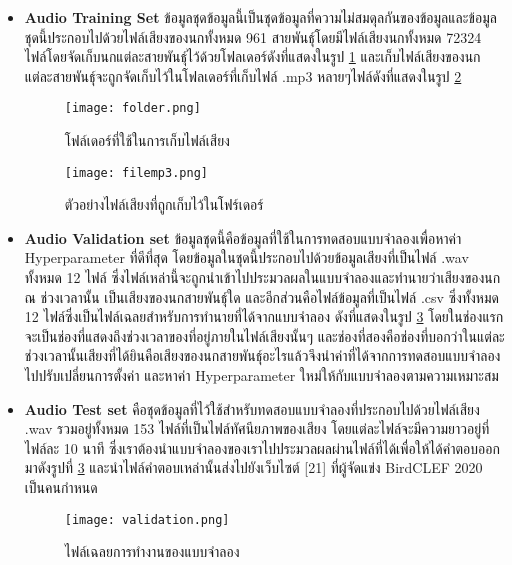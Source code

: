 \begin{itemize}
    \item \textbf{Audio Training Set} ข้อมูลชุดข้อมูลนี้เป็นชุดข้อมูลที่ความไม่สมดุลกันของข้อมูลและข้อมูลชุดนี้ประกอบไปด้วยไฟล์เสียงของนกทั้งหมด 961 สายพันธุ์โดยมีไฟล์เสียงนกทั้งหมด 72324 ไฟล์โดยจัดเก็บนกแต่ละสายพันธุ์ไว้ด้วยโฟลเดอร์ดังที่แสดงในรูป \ref{Fig:folder} และเก็บไฟล์เสียงของนกแต่ละสายพันธุ์จะถูกจัดเก็บไว้ในโฟลเดอร์ที่เก็บไฟล์ .mp3 หลายๆไฟล์ดังที่แสดงในรูป \ref{Fig:filemp3}
    \begin{figure}[h]
        \centering
        \texttt{[image: folder.png]}
        \caption{โฟล์เดอร์ที่ใช้ในการเก็บไฟล์เสียง}
        \label{Fig:folder}
    \end{figure}
    \begin{figure}[h]
        \centering
        \texttt{[image: filemp3.png]}
        \caption{ตัวอย่างไฟล์เสียงที่ถูกเก็บไว้ในโฟร์เดอร์}
        \label{Fig:filemp3}
    \end{figure}
    \FloatBarrier

    \item \textbf{Audio Validation set} ข้อมูลชุดนี้คือข้อมูลที่ใช้ในการทดสอบแบบจำลองเพื่อหาค่า Hyperparameter ที่ดีที่สุด โดยข้อมูลในชุดนี้ประกอบไปด้วยข้อมูลเสียงที่เป็นไฟล์ .wav ทั้งหมด 12 ไฟล์ ซึ่งไฟล์เหล่านี้จะถูกนำเข้าไปประมวลผลในแบบจำลองและทำนายว่าเสียงของนก ณ ช่วงเวลานั้น 
    เป็นเสียงของนกสายพันธุ์ใด และอีกส่วนคือไฟล์ข้อมูลที่เป็นไฟล์ .csv ซึ่งทั้งหมด 12 ไฟล์ซึ่งเป็นไฟล์เฉลยสำหรับการทำนายที่ได้จากแบบจำลอง ดังที่แสดงในรูป \ref{Fig:validate} โดยในช่องแรกจะเป็นช่องที่แสดงถึงช่วงเวลาของที่อยู่ภายในไฟล์เสียงนั้นๆ และช่องที่สองคือช่องที่บอกว่าในแต่ละช่วงเวลานั้นเสียงที่ได้ยินคือเสียงของนกสายพันธุ์อะไรแล้วจึงนำค่าที่ได้จากการทดสอบแบบจำลองไปปรับเปลี่ยนการตั้งค่า และหาค่า Hyperparameter ใหม่ให้กับแบบจำลองตามความเหมาะสม
    \item \textbf{Audio Test set} คือชุดข้อมูลที่ไว้ใช้สำหรับทดสอบแบบจำลองที่ประกอบไปด้วยไฟล์เสียง .wav รวมอยู่ทั้งหมด 153 ไฟล์ที่เป็นไฟล์ทัศนียภาพของเสียง โดยแต่ละไฟล์จะมีความยาวอยู่ที่ไฟล์ละ 10 นาที ซึ่งเราต้องนำแบบจำลองของเราไปประมวลผลผ่านไฟล์ที่ได้เพื่อให้ได้คำตอบออกมาดังรูปที่ \ref{Fig:validate} และนำไฟล์คำตอบเหล่านั้นส่งไปยังเว็บไซต์ [21] ที่ผู้จัดแข่ง BirdCLEF 2020 เป็นคนกำหนด
    \begin{figure}[h]
        \centering
        \texttt{[image: validation.png]}
        \caption{ไฟล์เฉลยการทำงานของแบบจำลอง}
        \label{Fig:validate}
    \end{figure}
    \FloatBarrier
\end{itemize}




